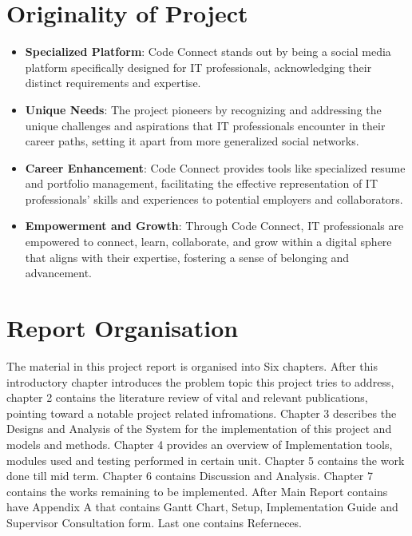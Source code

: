 \section{Originality of Project}

\begin{itemize}
    \item \textbf{Specialized Platform}: Code Connect stands out by being a social media platform specifically designed for IT professionals, acknowledging their distinct requirements and expertise.
    \item \textbf{Unique Needs}: The project pioneers by recognizing and addressing the unique challenges and aspirations that IT professionals encounter in their career paths, setting it apart from more generalized social networks.
    \item \textbf{Career Enhancement}: Code Connect provides tools like specialized resume and portfolio management, facilitating the effective representation of IT professionals' skills and experiences to potential employers and collaborators.
    \item \textbf{Empowerment and Growth}: Through Code Connect, IT professionals are empowered to connect, learn, collaborate, and grow within a digital sphere that aligns with their expertise, fostering a sense of belonging and advancement.
    
  \end{itemize}

\section{Report Organisation}
The material in this project report is organised into Six chapters. After this introductory chapter introduces the problem topic this project tries to address, chapter 2 contains the literature review of vital and relevant publications, pointing toward a notable project related infromations. Chapter 3 describes the Designs and Analysis of the System for the implementation of this project and models and methods. Chapter 4 provides an overview of Implementation tools, modules used and testing performed in certain unit. Chapter 5 contains the work done till mid term. Chapter 6 contains Discussion and Analysis. Chapter 7 contains the works remaining to be implemented. After Main Report contains have Appendix A that contains Gantt Chart, Setup, Implementation Guide and Supervisor Consultation form. Last one contains Referneces.